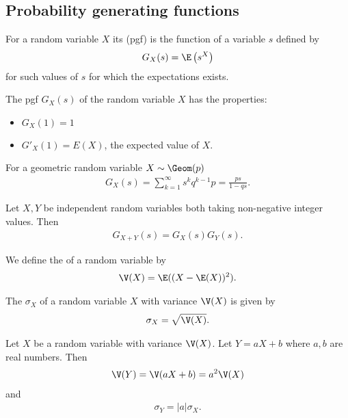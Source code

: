 \documentclass{article}
\begin{document}
\subsection{Probability generating functions}
\begin{definition}
    For a random variable $X$ its  (pgf) is the function of a variable
    $s$ defined by
    \begin{align*}
        G_X(s) = \E\left(s^X\right)
    \end{align*}
    for such values of $s$ for which the expectations exists.
\end{definition}
\begin{theorem}
    The pgf $G_X(s)$ of the random variable $X$ has the properties:
    \begin{itemize}
        \item $G_X(1) = 1$
        \item $G'_X(1)=E(X)$, the expected value of $X$.
    \end{itemize}
\end{theorem}
\begin{lemma}
    For a geometric random variable $X\sim \Geom(p)$
    \begin{align*}
        G_X(s) = \sum_{k=1}^\infty s^k q^{k-1}p
        = \frac{ps}{1-qs}.
    \end{align*}
\end{lemma}
\begin{theorem}
    Let $X,Y$ be independent random variables both taking
    non-negative integer values. Then
    \begin{align*}
        G_{X+Y}(s) = G_X(s)G_Y(s).
    \end{align*}
\end{theorem}
\begin{definition}
    We define the  of a random variable by
    \begin{align*}
        \V(X) = \E((X-\E(X))^2).
    \end{align*}
\end{definition}
\begin{definition}
    The  $\sigma_X$ of a random
    variable $X$ with variance $\V(X)$ is given by
    \begin{align*}
        \sigma_X = \sqrt{\V(X)}.
    \end{align*}
\end{definition}
\begin{theorem}
    Let $X$ be a random variable with variance $\V(X)$.
    Let $Y= a X + b$ where $a,b$ are real numbers.
    Then
    \begin{align*}
        \V(Y) = \V(aX+b) = a^2\V(X)
    \end{align*}
    and
    \begin{align*}
        \sigma_Y = |a|\sigma_X.
    \end{align*}
\end{theorem}
\end{document}
